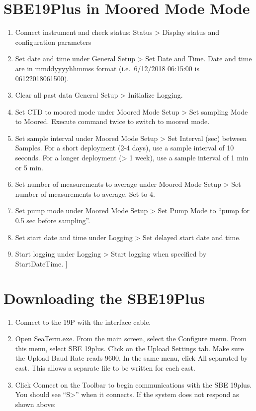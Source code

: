 \documentclass[]{book}
\providecommand{\tightlist}{%
  \setlength{\itemsep}{0pt}\setlength{\parskip}{0pt}}
\begin{document}
\section{SBE19Plus in Moored Mode
Mode}\label{sbe19plus-in-moored-mode-mode}

\begin{enumerate}
\def\labelenumi{\arabic{enumi}.}
\tightlist
\item
  Connect instrument and check status: Status \textgreater{} Display
  status and configuration parameters
\item
  Set date and time under General Setup \textgreater{} Set Date and
  Time. Date and time are in mmddyyyyhhmmss format (i.e.~6/12/2018
  06:15:00 is 06122018061500).
\item
  Clear all past data General Setup \textgreater{} Initialize Logging.
\item
  Set CTD to moored mode under Moored Mode Setup \textgreater{} Set
  sampling Mode to Moored. Execute command twice to switch to moored
  mode.
\item
  Set sample interval under Moored Mode Setup \textgreater{} Set
  Interval (sec) between Samples. For a short deployment (2-4 days), use
  a sample interval of 10 seconds. For a longer deployment
  (\textgreater{} 1 week), use a sample interval of 1 min or 5 min.
\item
  Set number of measurements to average under Moored Mode Setup
  \textgreater{} Set number of measurements to average. Set to 4.
\item
  Set pump mode under Moored Mode Setup \textgreater{} Set Pump Mode to
  ``pump for 0.5 sec before sampling''.
\item
  Set start date and time under Logging \textgreater{} Set delayed start
  date and time.
\item
  Start logging under Logging \textgreater{} Start logging when
  specified by StartDateTime. {]}
\end{enumerate}

\section{Downloading the SBE19Plus}\label{downloading-the-sbe19plus}

\begin{enumerate}
\def\labelenumi{\arabic{enumi}.}
\tightlist
\item
  Connect to the 19P with the interface cable.\\
\item
  Open SeaTerm.exe. From the main screen, select the Configure menu.
  From this menu, select SBE 19plus. Click on the Upload Settings tab.
  Make sure the Upload Baud Rate reads 9600. In the same menu, click All
  separated by cast. This allows a separate file to be written for each
  cast.
\item
  Click Connect on the Toolbar to begin communications with the SBE
  19plus. You should see ``S\textgreater{}'' when it connects. If the
  system does not respond as shown above:
\end{enumerate}
\end{document}
